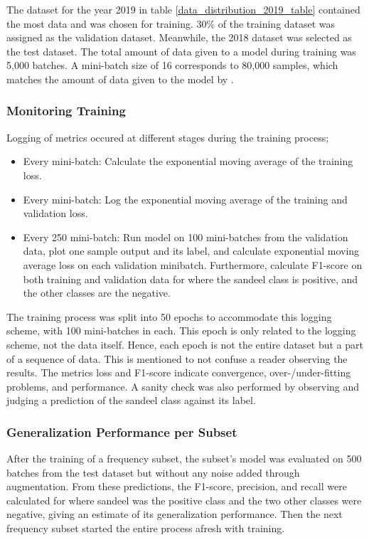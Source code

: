         
        
        The dataset for the year 2019 in table \ref{data_distribution_2019_table} contained the most data and was chosen for training. 30\% of the training dataset was assigned as the validation dataset. Meanwhile, the 2018 dataset was selected as the test dataset. The total amount of data given to a model during training was 5,000 batches. A mini-batch size of 16 corresponds to 80,000 samples, which matches the amount of data given to the model by  \citeauthor{brautaset2020acoustic}\cite{brautaset2020acoustic}.
        
        \subsubsection{Monitoring Training}
        Logging of metrics occured at different stages during the training process;
            \begin{itemize}
                \item Every mini-batch: Calculate the exponential moving average of the training loss.
                \item Every mini-batch: Log the exponential moving average of the training and validation loss.
                \item Every 250 mini-batch: Run model on 100 mini-batches from the validation data, plot one sample output and its label, and calculate  exponential moving average loss on each validation minibatch. Furthermore, calculate F1-score on both training and validation data for where the sandeel class is positive, and the other classes are the negative.
            \end{itemize}
            
        The training process was split into 50 epochs to accommodate this logging scheme, with 100 mini-batches in each. This epoch is only related to the logging scheme, not the data itself. Hence, each epoch is not the entire dataset but a part of a sequence of data. This is mentioned to not confuse a reader observing the results. The metrics loss and F1-score indicate convergence, over-/under-fitting problems, and performance. A sanity check was also performed by observing and judging a prediction of the sandeel class against its label.
        
        \subsubsection{Generalization Performance per Subset}
        After the training of a frequency subset, the subset’s model was evaluated on 500 batches from the test dataset but without any noise added through augmentation. From these predictions, the F1-score, precision, and recall were calculated for where sandeel was the positive class and the two other classes were negative, giving an estimate of its generalization performance. Then the next frequency subset started the entire process afresh with training.
        
